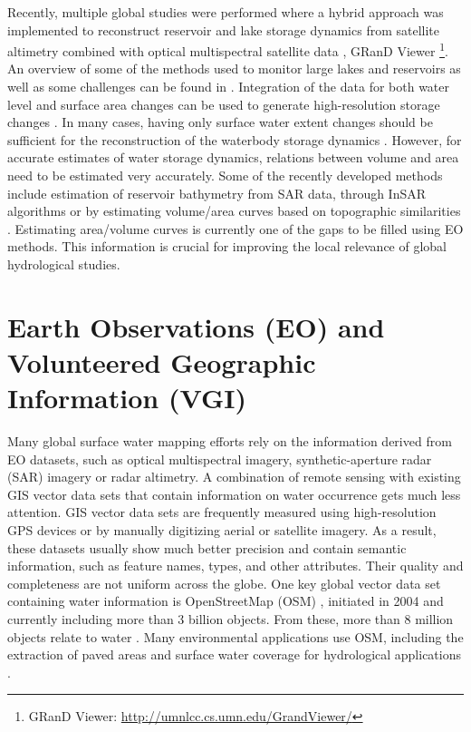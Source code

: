 Recently, multiple global studies were performed where a hybrid approach was implemented to reconstruct reservoir and lake storage dynamics from satellite altimetry combined with optical multispectral satellite data \citet{khandelwal2016approach}, GRanD Viewer \footnote{GRanD Viewer: \url{http://umnlcc.cs.umn.edu/GrandViewer/}}. An overview of some of the methods used to monitor large lakes and reservoirs as well as some challenges can be found in \citet{karpatne2016global}. Integration of the data for both water level and surface area changes can be used to generate high-resolution storage changes \cite{duan2013estimating}. In many cases, having only surface water extent changes should be sufficient for the reconstruction of the waterbody storage dynamics \citet{liebe2005estimation}. However, for accurate estimates of water storage dynamics, relations between volume and area need to be estimated very accurately.  Some of the recently developed methods include estimation of reservoir bathymetry from SAR data, through InSAR algorithms \citet{amitrano2014sentinel} or by estimating volume/area curves based on topographic similarities \citet{bemmelen2016determining}. Estimating area/volume curves is currently one of the gaps to be filled using EO methods. This information is crucial for improving the local relevance of global hydrological studies. 

\section{Earth Observations (EO) and Volunteered Geographic Information (VGI)}
Many global surface water mapping efforts rely on the information derived from EO datasets, such as optical multispectral imagery, synthetic-aperture radar (SAR) imagery or radar altimetry. A combination of remote sensing with existing GIS vector data sets that contain information on water occurrence gets much less attention. GIS vector data sets are frequently measured using high-resolution GPS devices or by manually digitizing aerial or satellite imagery. As a result, these datasets usually show much better precision and contain semantic information, such as feature names, types, and other attributes. Their quality and completeness are not uniform across the globe. One key global vector data set containing water information is OpenStreetMap (OSM) \citet{Haklay2010}, initiated in 2004 and currently including more than 3 billion objects. From these, more than 8 million objects relate to water \citet{webOSMTagInfo}. Many environmental applications use OSM, including the extraction of paved areas and surface water coverage for hydrological applications \citet{Schellekens2014}. 

